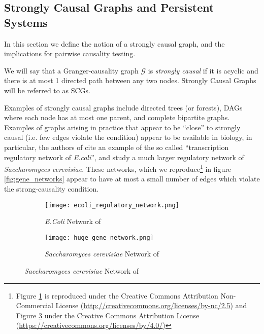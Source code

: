 \documentclass[12pt]{article}
\def\gcg{\mathcal{G}}  %
\begin{document}
\subsection{Strongly Causal Graphs and Persistent Systems}
\label{sec:strongly_causal_graphs}
In this section we define the notion of a strongly causal graph, and
the implications for pairwise causality testing.

\begin{definition}
  \label{def:strongly_causal}
  We will say that a Granger-causality graph $\gcg$ is
  \textit{strongly causal} if it is acyclic and there is at most 1
  directed path between any two nodes.  Strongly Causal Graphs will be
  referred to as SCGs.
\end{definition}

  Examples of strongly causal graphs include directed trees (or
  forests), DAGs where each node has at most one parent, and complete
  bipartite graphs.  Examples of graphs arising in practice that appear
  to be ``close'' to strongly causal (i.e. few edges violate the condition)
  appear to be available in biology, in particular, the authors of
  \cite{discovering_graphical_Granger_causality_using_the_truncating_lasso_penalty}
  cite an example of the so called ``transcription regulatory network
  of \textit{E.coli}'', and
  \cite{learning_genome_scale_regulatory_networks} study a much larger
  regulatory network of \textit{Saccharomyces cerevisiae}.  These
  networks, which we reproduce\footnote{Figure \ref{fig:gene_network1}
    is reproduced under the Creative Commons Attribution
    Non-Commercial License
    (\url{http://creativecommons.org/licenses/by-nc/2.5}) and Figure
    \ref{fig:gene_network2} under the Creative Commons Attribution
    License (\url{https://creativecommons.org/licenses/by/4.0/})} in
  figure \ref{fig:gene_networks} appear to have at most a small number
  of edges which violate the strong-causality condition.

  \begin{figure}[h]
    \centering
    \caption{Transcription Regulatory Networks}
    \label{fig:gene_networks}
    \begin{subfigure}[b]{0.45\textwidth}
      \caption{\textit{E.Coli} Network of
        \cite{discovering_graphical_Granger_causality_using_the_truncating_lasso_penalty}}
      \label{fig:gene_network1}
      \texttt{[image: ecoli\_regulatory\_network.png]}
    \end{subfigure}
    \begin{subfigure}[b]{0.45\textwidth}
      \caption{\textit{Saccharomyces cerevisiae} Network of
        \cite{learning_genome_scale_regulatory_networks}}
      \label{fig:gene_network2}
      \texttt{[image: huge\_gene\_network.png]}
    \end{subfigure}
  \end{figure}
\end{document}
